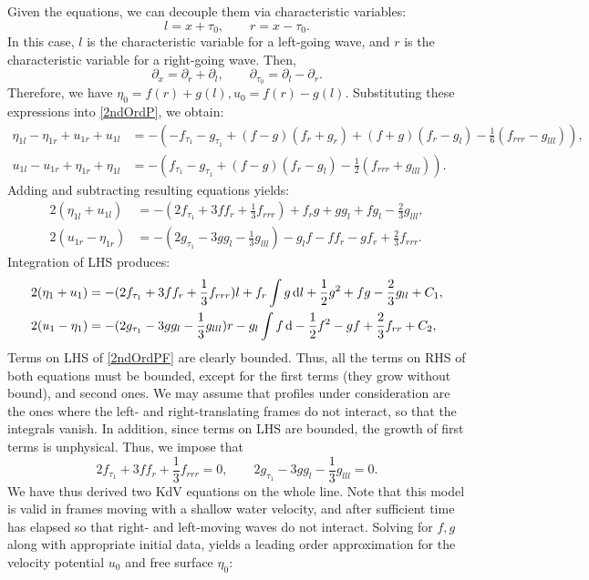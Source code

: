 \documentclass[10pt,reqno,oneside,a4paper]{article}
\begin{document}
Given the equations, we can decouple them via characteristic variables:
\begin{equation}\label{CharVars}
l = x + \tau_0, \qquad r= x - \tau_0.
\end{equation}
In this case, $l$ is the characteristic variable for a left-going wave, and $r$ is the characteristic variable for a right-going wave. Then, 
\[ 
\partial_x = \partial_r + \partial_l, \qquad \partial_{\tau_0} = \partial_l - \partial_r.
\]
Therefore, we have $\eta_0 = f(r) + g(l), u_0 = f(r)- g(l).$ Substituting these expressions into \eqref{2ndOrdP}, we obtain:
\begin{align*}
\eta_{1l} - \eta_{1r} + u_{1r} + u_{1l} &= - (-f_{\tau_1} - g_{\tau_1} + (f-g)(f_r + g_r) + (f + g)(f_r- g_l) - \frac{1}{6}(f_{rrr}-g_{lll})), \\
u_{1l} - u_{1r} + \eta_{1r} + \eta_{1l} &= - (f_{\tau_1} - g_{\tau_1} + (f-g)(f_r - g_l) - \frac{1}{2}(f_{rrr}+g_{lll})).
\end{align*}
Adding and subtracting resulting equations yields:
\begin{align*}
2(\eta_{1l} + u_{1l}) &= - (2f_{\tau_1}+ 3ff_r + \frac{1}{3}f_{rrr}) +f_r g +g g_l + fg_l - \frac{2}{3}g_{lll}, \\
2(u_{1r} - \eta_{1r}) &= - (2g_{\tau_1} - 3gg_l - \frac{1}{3}g_{lll}) - g_l f- f f_r - g f_r + \frac{2}{3}f_{rrr}. 
\end{align*}
Integration of LHS produces:
\begin{subequations}\label{2ndOrdPF}
\begin{align}
2(\eta_{1} + u_{1}) &= - (2f_{\tau_1}+ 3ff_r + \frac{1}{3}f_{rrr})l +f_r \int g \,\mathrm{d} l +\frac{1}{2}g^2 + fg - \frac{2}{3}g_{ll} + C_1, \\
2(u_{1} - \eta_{1}) &= - (2g_{\tau_1} - 3gg_l - \frac{1}{3}g_{lll})r - g_l \int f \,\mathrm{d} - \frac{1}{2}f^2 - g f + \frac{2}{3}f_{rr} + C_2,
\end{align}
\end{subequations}
Terms on LHS of \eqref{2ndOrdPF} are clearly bounded. Thus, all the terms on RHS of both equations must be bounded, except for the first terms (they grow without bound), and second ones. We may assume that profiles under consideration are the ones where the left- and right-translating frames do not interact, so that the integrals vanish. In addition, since terms on LHS are bounded, the growth of first terms is unphysical. Thus, we impose that 
\[ 
2f_{\tau_1}+ 3ff_r + \frac{1}{3}f_{rrr} = 0, \qquad 2g_{\tau_1} - 3gg_l - \frac{1}{3}g_{lll} = 0.
\]
We have thus derived two KdV equations on the whole line. Note that this model is valid in frames moving with a shallow water velocity, and after sufficient time has elapsed so that right- and left-moving waves do not interact. Solving for $f, g$ along with appropriate initial data, yields a leading order approximation for the velocity potential $u_0$ and free surface $\eta_0:$
\end{document}
